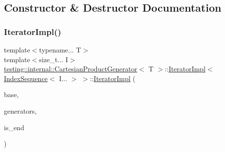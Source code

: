 \subsection{Constructor \& Destructor Documentation}
\mbox{\label{classtesting_1_1internal_1_1CartesianProductGenerator_1_1IteratorImpl_3_01IndexSequence_3_01I_8_8_8_01_4_01_4_a3c28d20b4527f146a97c5490326f869f}} 
\subsubsection{\texorpdfstring{Iterator\+Impl()}{IteratorImpl()}}
{\footnotesize\ttfamily template$<$typename... T$>$ \\
template$<$size\+\_\+t... I$>$ \\
\hyperlink{classtesting_1_1internal_1_1CartesianProductGenerator}{testing\+::internal\+::\+Cartesian\+Product\+Generator}$<$ T $>$\+::\hyperlink{classtesting_1_1internal_1_1CartesianProductGenerator_1_1IteratorImpl}{Iterator\+Impl}$<$ \hyperlink{structtesting_1_1internal_1_1IndexSequence}{Index\+Sequence}$<$ I... $>$ $>$\+::\hyperlink{classtesting_1_1internal_1_1CartesianProductGenerator_1_1IteratorImpl}{Iterator\+Impl} (\begin{DoxyParamCaption}\item[{const \hyperlink{classtesting_1_1internal_1_1ParamGeneratorInterface}{Param\+Generator\+Interface}$<$ \hyperlink{classtesting_1_1internal_1_1CartesianProductGenerator_af27131157a9347f0c82420ca081ee7dd}{Param\+Type} $>$ $\ast$}]{base,  }\item[{const std\+::tuple$<$ \hyperlink{classtesting_1_1internal_1_1ParamGenerator}{Param\+Generator}$<$ T $>$... $>$ \&}]{generators,  }\item[{bool}]{is\+\_\+end }\end{DoxyParamCaption})\hspace{0.3cm}{\ttfamily [inline]}}

